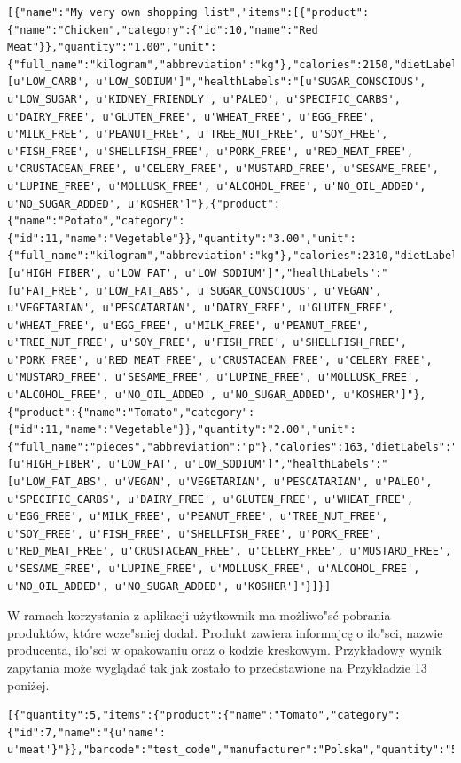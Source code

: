 \documentclass{article}
\begin{document}
\begin{lstlisting}[label=shoppinglist_api,caption=Pobranie listy zakupowej,breaklines=true]
[{"name":"My very own shopping list","items":[{"product":{"name":"Chicken","category":{"id":10,"name":"Red Meat"}},"quantity":"1.00","unit":{"full_name":"kilogram","abbreviation":"kg"},"calories":2150,"dietLabels":"[u'LOW_CARB', u'LOW_SODIUM']","healthLabels":"[u'SUGAR_CONSCIOUS', u'LOW_SUGAR', u'KIDNEY_FRIENDLY', u'PALEO', u'SPECIFIC_CARBS', u'DAIRY_FREE', u'GLUTEN_FREE', u'WHEAT_FREE', u'EGG_FREE', u'MILK_FREE', u'PEANUT_FREE', u'TREE_NUT_FREE', u'SOY_FREE', u'FISH_FREE', u'SHELLFISH_FREE', u'PORK_FREE', u'RED_MEAT_FREE', u'CRUSTACEAN_FREE', u'CELERY_FREE', u'MUSTARD_FREE', u'SESAME_FREE', u'LUPINE_FREE', u'MOLLUSK_FREE', u'ALCOHOL_FREE', u'NO_OIL_ADDED', u'NO_SUGAR_ADDED', u'KOSHER']"},{"product":{"name":"Potato","category":{"id":11,"name":"Vegetable"}},"quantity":"3.00","unit":{"full_name":"kilogram","abbreviation":"kg"},"calories":2310,"dietLabels":"[u'HIGH_FIBER', u'LOW_FAT', u'LOW_SODIUM']","healthLabels":"[u'FAT_FREE', u'LOW_FAT_ABS', u'SUGAR_CONSCIOUS', u'VEGAN', u'VEGETARIAN', u'PESCATARIAN', u'DAIRY_FREE', u'GLUTEN_FREE', u'WHEAT_FREE', u'EGG_FREE', u'MILK_FREE', u'PEANUT_FREE', u'TREE_NUT_FREE', u'SOY_FREE', u'FISH_FREE', u'SHELLFISH_FREE', u'PORK_FREE', u'RED_MEAT_FREE', u'CRUSTACEAN_FREE', u'CELERY_FREE', u'MUSTARD_FREE', u'SESAME_FREE', u'LUPINE_FREE', u'MOLLUSK_FREE', u'ALCOHOL_FREE', u'NO_OIL_ADDED', u'NO_SUGAR_ADDED', u'KOSHER']"},{"product":{"name":"Tomato","category":{"id":11,"name":"Vegetable"}},"quantity":"2.00","unit":{"full_name":"pieces","abbreviation":"p"},"calories":163,"dietLabels":"[u'HIGH_FIBER', u'LOW_FAT', u'LOW_SODIUM']","healthLabels":"[u'LOW_FAT_ABS', u'VEGAN', u'VEGETARIAN', u'PESCATARIAN', u'PALEO', u'SPECIFIC_CARBS', u'DAIRY_FREE', u'GLUTEN_FREE', u'WHEAT_FREE', u'EGG_FREE', u'MILK_FREE', u'PEANUT_FREE', u'TREE_NUT_FREE', u'SOY_FREE', u'FISH_FREE', u'SHELLFISH_FREE', u'PORK_FREE', u'RED_MEAT_FREE', u'CRUSTACEAN_FREE', u'CELERY_FREE', u'MUSTARD_FREE', u'SESAME_FREE', u'LUPINE_FREE', u'MOLLUSK_FREE', u'ALCOHOL_FREE', u'NO_OIL_ADDED', u'NO_SUGAR_ADDED', u'KOSHER']"}]}]
\end{lstlisting}

W ramach korzystania z aplikacji użytkownik ma możliwo"sć pobrania produktów, które wcze"sniej dodał. Produkt zawiera informajcę o ilo"sci, nazwie producenta, ilo"sci w opakowaniu oraz o kodzie kreskowym. Przykładowy wynik zapytania może wyglądać tak jak zostało to przedstawione na Przykładzie 13 poniżej.

\begin{lstlisting}[label=product_api,caption=Pobranie produktów,breaklines=true]
[{"quantity":5,"items":{"product":{"name":"Tomato","category":{"id":7,"name":"{u'name': u'meat'}"}},"barcode":"test_code","manufacturer":"Polska","quantity":"5.00"}}]
\end{lstlisting}
\end{document}
